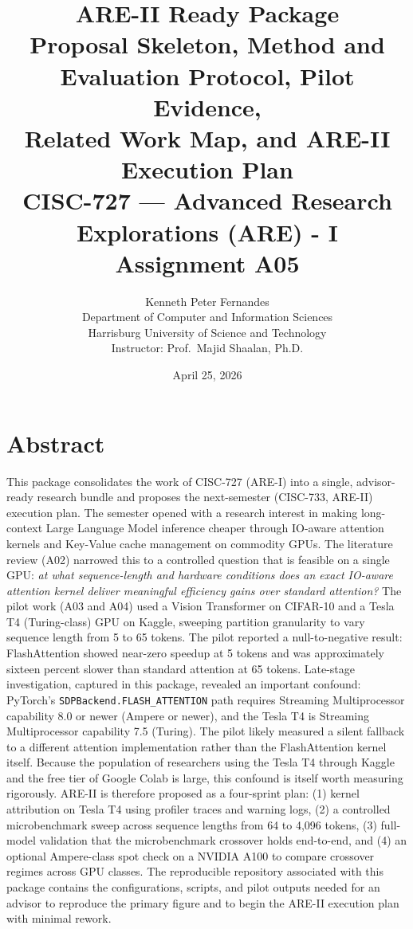 \documentclass[11pt]{article}
\title{%
    \vspace{0.5in}
    \textbf{ARE-II Ready Package}\\[0.3em]
    \large Proposal Skeleton, Method and Evaluation Protocol, Pilot Evidence,\\
    Related Work Map, and ARE-II Execution Plan\\[1em]
    \large CISC-727 --- Advanced Research Explorations (ARE) - I\\[0.2em]
    \large Assignment A05\\[1em]
}
\author{%
    Kenneth Peter Fernandes\\
    Department of Computer and Information Sciences\\
    Harrisburg University of Science and Technology\\[0.5em]
    Instructor: Prof.\ Majid Shaalan, Ph.D.
}
\date{April 25, 2026}
\begin{document}
\maketitle
\thispagestyle{empty}
\newpage

\tableofcontents
\newpage

\section*{Abstract}

This package consolidates the work of CISC-727 (ARE-I) into a single, advisor-ready research bundle and proposes the next-semester (CISC-733, ARE-II) execution plan. The semester opened with a research interest in making long-context Large Language Model inference cheaper through IO-aware attention kernels and Key-Value cache management on commodity GPUs. The literature review (A02) narrowed this to a controlled question that is feasible on a single GPU: \textit{at what sequence-length and hardware conditions does an exact IO-aware attention kernel deliver meaningful efficiency gains over standard attention?} The pilot work (A03 and A04) used a Vision Transformer on CIFAR-10 and a Tesla T4 (Turing-class) GPU on Kaggle, sweeping partition granularity to vary sequence length from 5 to 65 tokens. The pilot reported a null-to-negative result: FlashAttention showed near-zero speedup at 5 tokens and was approximately sixteen percent slower than standard attention at 65 tokens. Late-stage investigation, captured in this package, revealed an important confound: PyTorch's \texttt{SDPBackend.FLASH\_ATTENTION} path requires Streaming Multiprocessor capability 8.0 or newer (Ampere or newer), and the Tesla T4 is Streaming Multiprocessor capability 7.5 (Turing). The pilot likely measured a silent fallback to a different attention implementation rather than the FlashAttention kernel itself. Because the population of researchers using the Tesla T4 through Kaggle and the free tier of Google Colab is large, this confound is itself worth measuring rigorously. ARE-II is therefore proposed as a four-sprint plan: (1) kernel attribution on Tesla T4 using profiler traces and warning logs, (2) a controlled microbenchmark sweep across sequence lengths from 64 to 4{,}096 tokens, (3) full-model validation that the microbenchmark crossover holds end-to-end, and (4) an optional Ampere-class spot check on a NVIDIA A100 to compare crossover regimes across GPU classes. The reproducible repository associated with this package contains the configurations, scripts, and pilot outputs needed for an advisor to reproduce the primary figure and to begin the ARE-II execution plan with minimal rework.
\end{document}

